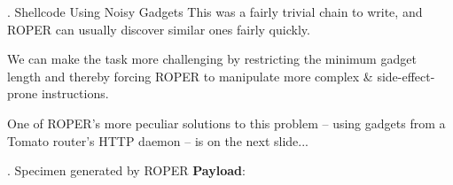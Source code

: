 \documentclass[9pt]{beamer}
\newcommand{\Gap} { \\ \pause \vspace{8pt} }
\begin{document}
\begin{frame}{\theframenumber. Shellcode Using Noisy Gadgets}
  This was a fairly trivial chain to write, and ROPER can usually discover similar ones fairly quickly. \Gap
  
  We can make the task more challenging by restricting the minimum gadget length and thereby forcing ROPER to manipulate more complex \& side-effect-prone instructions. \Gap
  
  One of ROPER's more peculiar solutions to this problem -- using gadgets from a Tomato router's HTTP daemon -- is on the next slide...
\end{frame}

\begin{frame}{\theframenumber. Specimen generated by ROPER}
  \textbf{Payload}:
  \\
  

\end{frame}
\end{document}
